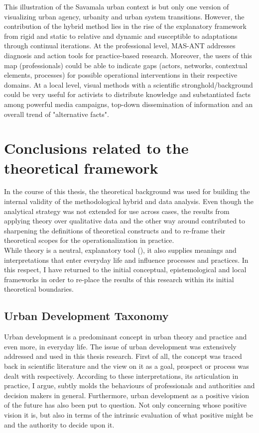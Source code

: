 \documentclass[11pt]{report}
\begin{document}
{{{This illustration of the Savamala urban context is but only one version of visualizing urban agency, urbanity and urban system transitions. However, the contribution of the hybrid method lies in the rise of the explanatory framework from rigid and static to relative and dynamic and susceptible to adaptations through continual iterations. At the professional level, MAS-ANT addresses diagnosis and action tools for practice-based research. Moreover, the users of this map (professionals) could be able to indicate gaps (actors, networks, contextual elements, processes) for possible operational interventions in their respective domains. At a local level, visual methods with a scientific stronghold/background could be very useful for activists to distribute knowledge and substantiated facts among powerful media campaigns, top-down dissemination of information and an overall trend of "alternative facts".

\section{Conclusions related to the theoretical framework}

In the course of this thesis, the theoretical background was used for building the internal validity of the methodological hybrid and data analysis. Even though the analytical strategy was not extended for use across cases, the results from applying theory over qualitative data and the other way around contributed to sharpening the definitions of theoretical constructs and to re-frame their theoretical scopes for the operationalization in practice.
\\

While theory is a neutral, explanatory tool (\href{Sears}{\citealt{sears_good_2005}}), it also supplies meanings and interpretations that enter everyday life and influence processes and practices.
In this respect, I have returned to the initial conceptual, epistemological and local frameworks in order to re-place the results of this research within its initial theoretical boundaries.

\subsection{Urban Development Taxonomy}

Urban development is a predominant concept in urban theory and practice and even more, in everyday life.
The issue of urban development was extensively addressed and used in this thesis research.
First of all, the concept was traced back in scientific literature and the view on it as a goal, prospect or process was dealt with respectively.
According to these interpretations, its articulation in practice, I argue, subtly molds the behaviours of professionals and authorities and decision makers in general.
Furthermore, urban development as a positive vision of the future has also been put to question.
Not only concerning whose positive vision it is, but also in terms of the intrinsic evaluation of what positive might be and the authority to decide upon it.
\\

}}}
\end{document}
